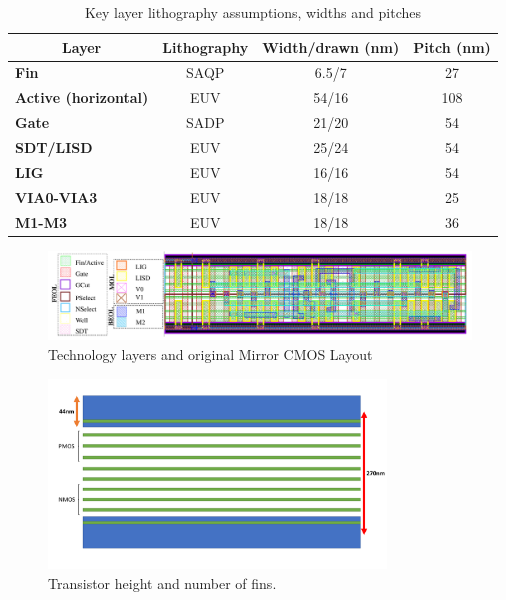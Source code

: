 \documentclass[ecp,tc, english]{iiufrgs}
\begin{document}
\begin{table}[H]
\centering
\caption{Key layer lithography assumptions, widths and pitches}
\label{layers}
\begin{tabular}{lccc}
\hline
\multicolumn{1}{c}{\textbf{Layer}} & \textbf{Lithography} & \textbf{Width/drawn (nm)} & \textbf{Pitch (nm)} \\ \hline
\textbf{Fin}                         & SAQP                 & 6.5/7                     & 27                  \\ \hline
\textbf{Active (horizontal)}         & EUV                  & 54/16                     & 108                 \\ \hline
\textbf{Gate}                        & SADP                 & 21/20                     & 54                  \\ \hline
\textbf{SDT/LISD}                    & EUV                  & 25/24                     & 54                  \\ \hline
\textbf{LIG}                         & EUV                  & 16/16                     & 54                  \\ \hline
\textbf{VIA0-VIA3}                   & EUV                  & 18/18                     & 25                  \\ \hline
\textbf{M1-M3}                       & EUV                  & 18/18                     & 36                  \\ \hline
\end{tabular}
\end{table}

\begin{figure}[H]
\centering
\includegraphics[width=\textwidth]{Layers.pdf}
\caption{Technology layers and original Mirror CMOS Layout}
\label{fig:layers}
\end{figure}

\begin{figure}[H]
\centering
\includegraphics[width=0.8\textwidth]{transistorHeight.pdf}
\caption{Transistor height and number of fins.}
\label{th}
\end{figure}
\end{document}
